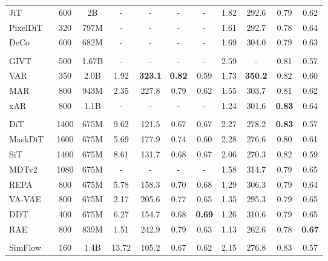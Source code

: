 \documentclass[]{bytedance_seed}
\begin{document}
\begin{table}[]
{\begin{tabular}{l cc cccc cccc}
JiT~\citep{jit} & 600 & 2B &  - & - & - & - & 1.82 & 292.6 & 0.79 & 0.62\\
PixelDiT~\citep{pixeldit} & 320 & 797M & - & - & - & - & 1.61 & 292.7 & 0.78 & 0.64\\
DeCo~\citep{deco} & 600 & 682M & - & - & - & - & 1.69 & 304.0 & 0.79 & 0.63 \\
\arrayrulecolor{black}\midrule
\multicolumn{11}{l}{\textit{Latent Autoregressive}} \\
\arrayrulecolor{black!30}\midrule
GIVT~\citep{tschannen2023givt} & 500 & 1.67B & - & - & - & - & 2.59 & - &  0.81 & 0.57\\
VAR~\citep{var} &  350  &  2.0B  & 1.92 & \textbf{323.1}  & \textbf{0.82} & 0.59 & 1.73 & \textbf{350.2} & 0.82 & 0.60\\
MAR~\citep{mar} &  800  &  943M   & 2.35 &  227.8 & 0.79 & 0.62 & 1.55 & 303.7 & 0.81 & 0.62\\
xAR~\citep{xar} &  800  & 1.1B  &  - & - & - & - & 1.24 & 301.6 & \textbf{0.83} & 0.64\\
\arrayrulecolor{black}\midrule
\multicolumn{11}{l}{\textit{Latent Diffusion}} \\
\arrayrulecolor{black!30}\midrule
DiT~\citep{dit} & 1400 & 675M &  9.62 & 121.5 & 0.67 & 0.67 & 2.27 & 278.2 & \textbf{0.83} & 0.57 \\
MaskDiT~\citep{maskdit} & 1600 & 675M &  5.69 & 177.9 & 0.74 & 0.60 & 2.28 & 276.6 & 0.80 & 0.61 \\
SiT~\citep{sit} & 1400 & 675M &  8.61 & 131.7 & 0.68 & 0.67 & 2.06 & 270.3 & 0.82 & 0.59 \\
MDTv2~\citep{gao2023mdtv2} & 1080 & 675M &  - & - & - & - & 1.58 & 314.7 & 0.79 & 0.65 \\
REPA~\citep{repa} & 800 & 675M &  5.78 & 158.3 & 0.70 & 0.68 & 1.29 & 306.3 & 0.79 & 0.64 \\
VA-VAE~\citep{vavae} & 800 & 675M &  2.17 & 205.6 & 0.77 & 0.65 & 1.35 & 295.3 & 0.79 & 0.65 \\
DDT~\citep{decoupled_dit} & 400 & 675M &  6.27 & 154.7 & 0.68 & \textbf{0.69} & 1.26 & 310.6 & 0.79 & 0.65\\
RAE~\citep{rae} & 800 & 839M &  1.51 & 242.9 & 0.79 & 0.63 & 1.13 & 262.6 & 0.78 & \textbf{0.67} \\
 \arrayrulecolor{black}\midrule
\multicolumn{11}{l}{\textit{End-to-End Generative models}} \\
\arrayrulecolor{black!30}\midrule
SimFlow~\citep{simflow} & 160 & 1.4B &  13.72 & 105.2 & 0.67 & 0.62 & 2.15 & 276.8 & 0.83 & 0.57 \\

\end{tabular}}
\end{table}
\end{document}
